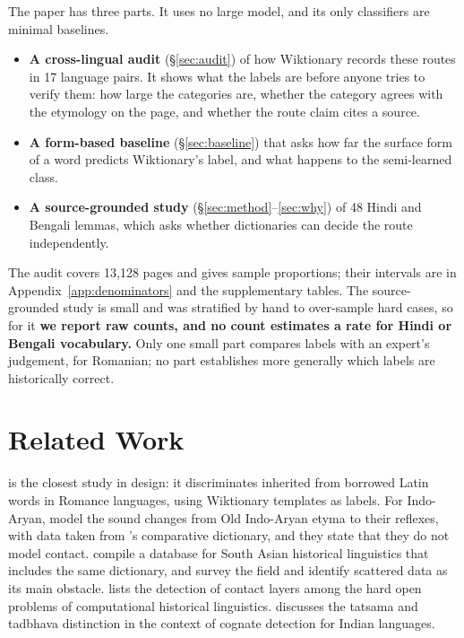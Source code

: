 \documentclass[11pt]{article}
\begin{document}
The paper has three parts. It uses no large model, and its only classifiers are minimal baselines.
\begin{itemize}
\item \textbf{A cross-lingual audit} (\S\ref{sec:audit}) of how Wiktionary records these routes in 17 language pairs. It shows what the labels are before anyone tries to verify them: how large the categories are, whether the category agrees with the etymology on the page, and whether the route claim cites a source.
\item \textbf{A form-based baseline} (\S\ref{sec:baseline}) that asks how far the surface form of a word predicts Wiktionary's label, and what happens to the semi-learned class.
\item \textbf{A source-grounded study} (\S\ref{sec:method}--\ref{sec:why}) of 48 Hindi and Bengali lemmas, which asks whether dictionaries can decide the route independently.
\end{itemize}
The audit covers 13,128 pages and gives sample proportions; their intervals are in Appendix~\ref{app:denominators} and the supplementary tables. The source-grounded study is small and was stratified by hand to over-sample hard cases, so for it \textbf{we report raw counts, and no count estimates a rate for Hindi or Bengali vocabulary.} Only one small part compares labels with an expert's judgement, for Romanian; no part establishes more generally which labels are historically correct.

\section{Related Work}

\citet{cristea2021inherited} is the closest study in design: it discriminates inherited from borrowed Latin words in Romance languages, using Wiktionary templates as labels. For Indo-Aryan, \citet{cathcart2020disentangling} model the sound changes from Old Indo-Aryan etyma to their reflexes, with data taken from \citeauthor{turner1966cdial}'s comparative dictionary, and they state that they do not model contact. \citet{arora2023jambu} compile a database for South Asian historical linguistics that includes the same dictionary, and \citet{arora2022computational} survey the field and identify scattered data as its main obstacle. \citet{list2024openproblems} lists the detection of contact layers among the hard open problems of computational historical linguistics. \citet[\S4.1]{kanojia2021thesis} discusses the tatsama and tadbhava distinction in the context of cognate detection for Indian languages.
\end{document}
